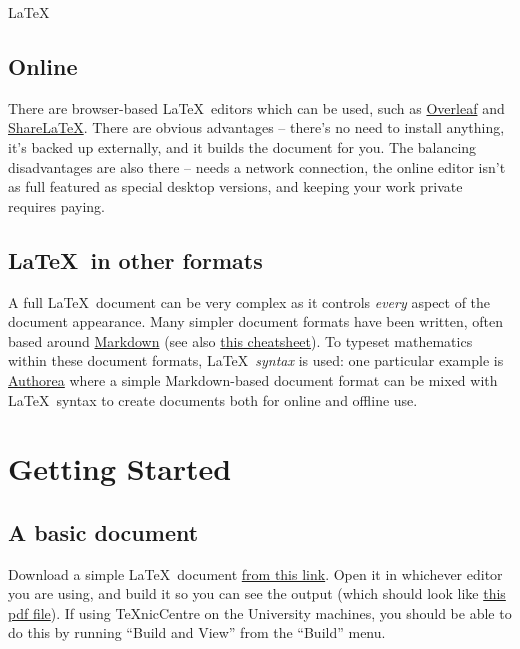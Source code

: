 \begin{chapter}{\LaTeX}
\subsection{Online}

There are browser-based \LaTeX\ editors which can be used, such as \href{https://www.overleaf.com/}{Overleaf} and \href{https://www.sharelatex.com/}{ShareLaTeX}. There are obvious advantages -- there's no need to install anything, it's backed up externally, and it builds the document for you. The balancing disadvantages are also there -- needs a network connection, the online editor isn't as full featured as special desktop versions, and keeping your work private requires paying.

\subsection{\LaTeX\ in other formats}

A full \LaTeX\ document can be very complex as it controls \emph{every} aspect of the document appearance. Many simpler document formats have been written, often based around \href{http://daringfireball.net/projects/markdown/}{Markdown} (see also \href{https://github.com/adam-p/markdown-here/wiki/Markdown-Cheatsheet}{this cheatsheet}). To typeset mathematics within these document formats, \LaTeX\ \emph{syntax} is used: one particular example is \href{https://www.authorea.com}{Authorea} where a simple Markdown-based document format can be mixed with \LaTeX\ syntax to create documents both for online and offline use.

\section{Getting Started}

\subsection{A basic document}

Download a simple \LaTeX\ document \href{}{from this link}. Open it in whichever editor you are using, and build it so you can see the output (which should look like \href{}{this pdf file}). If using TeXnicCentre on the University machines, you should be able to do this by running ``Build and View'' from the ``Build'' menu.

\end{chapter}
